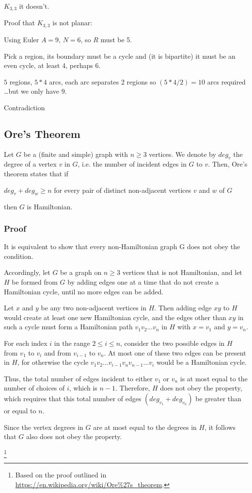 $K_{3,3}$ it doesn’t. 

Proof that $K_{3,3}$ is not planar: 

Using Euler
$A = 9$, $N=6$, so $R$ must be 5.  

Pick a region, its boundary must be a cycle and (it is bipartite) it must be an even cycle, at least 4, perhaps 6.

$5$ regions, $5*4$ arcs, each arc separates 2 regions so $(5*4/2) = 10$ arcs required \ldots but we only have 9. 

Contradiction 

\subsection{Ore's Theorem}

Let $G$ be a (finite and simple) graph with $n \ge 3$ vertices. We denote by $deg_v$ the degree of a vertex $v$ in $G$, i.e. the number of incident edges in $G$ to $v$. Then, Ore's theorem states that if

$deg_v + deg_w \ge n$ for every pair of distinct non-adjacent vertices $v$ and $w$ of $G$
 
then $G$ is Hamiltonian.

\subsubsection{Proof}

It is equivalent to show that every non-Hamiltonian graph G does not obey the condition.
 
 Accordingly, let $G$ be a graph on $n \ge 3$ vertices that is not Hamiltonian, and let $H$ be formed from $G$ by adding edges one at a time that do not create a Hamiltonian cycle, until no more edges can be added. 

 Let $x$ and $y$ be any two non-adjacent vertices in $H$. Then adding edge $xy$ to $H$ would create at least one new Hamiltonian cycle, and the edges other than $xy$ in such a cycle must form a Hamiltonian path $v_1 v_2 ... v_n$ in $H$ with $x = v_1$ and $y = v_n$. 

 For each index $i$ in the range $2 \le i \le n$, consider the two possible edges in $H$ from $v_1$ to $v_i$ and from $v_{i-1}$ to $v_n$. At most one of these two edges can be present in $H$, for otherwise the cycle $v_1 v_2 ... v_{i-1} v_n v_{n-1} ... v_i$ would be a Hamiltonian cycle.

 Thus, the total number of edges incident to either $v_1$ or $v_n$ is at most equal to the number of choices of $i$, which is $n-1$. Therefore, $H$ does not obey the property, which requires that this total number of edges $(deg_{v_1} + deg_{v_n})$ be greater than or equal to $n$. 

 Since the vertex degrees in $G$ are at most equal to the degrees in $H$, it follows that $G$ also does not obey the property.

\footnote{Based on the proof outlined in \url{https://en.wikipedia.org/wiki/Ore\%27s_theorem}.}
